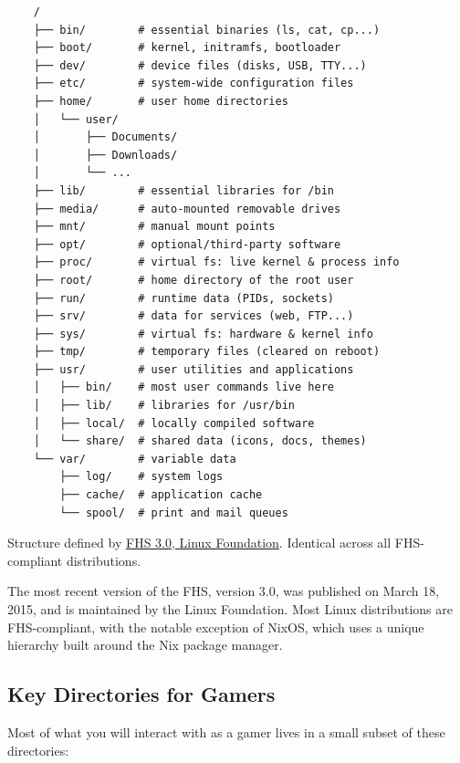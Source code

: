 \documentclass{article}
\begin{document}
\begin{verbatim}
	/
	├── bin/        # essential binaries (ls, cat, cp...)
	├── boot/       # kernel, initramfs, bootloader
	├── dev/        # device files (disks, USB, TTY...)
	├── etc/        # system-wide configuration files
	├── home/       # user home directories
	│   └── user/
	│       ├── Documents/
	│       ├── Downloads/
	│       └── ...
	├── lib/        # essential libraries for /bin
	├── media/      # auto-mounted removable drives
	├── mnt/        # manual mount points
	├── opt/        # optional/third-party software
	├── proc/       # virtual fs: live kernel & process info
	├── root/       # home directory of the root user
	├── run/        # runtime data (PIDs, sockets)
	├── srv/        # data for services (web, FTP...)
	├── sys/        # virtual fs: hardware & kernel info
	├── tmp/        # temporary files (cleared on reboot)
	├── usr/        # user utilities and applications
	│   ├── bin/    # most user commands live here
	│   ├── lib/    # libraries for /usr/bin
	│   ├── local/  # locally compiled software
	│   └── share/  # shared data (icons, docs, themes)
	└── var/        # variable data
	    ├── log/    # system logs
	    ├── cache/  # application cache
	    └── spool/  # print and mail queues
\end{verbatim}

{\footnotesize\color{gray} Structure defined by
	\href{https://refspecs.linuxfoundation.org/FHS_3.0/fhs/index.html}{FHS 3.0,
		Linux Foundation}. Identical across all FHS-compliant distributions.}

\begin{tcolorbox}[arc=12pt, outer arc=10pt,
	colback=blue!4!white, colframe=blue!40!black,
	title=\textbf{FHS 3.0}]
	The most recent version of the FHS, version 3.0, was published on March 18,
	2015, and is maintained by the Linux Foundation. Most Linux distributions are
	FHS-compliant, with the notable exception of NixOS, which uses a unique hierarchy
	built around the Nix package manager. 
\end{tcolorbox}
\subsection{Key Directories for Gamers}

Most of what you will interact with as a gamer lives in a small subset of these
directories:
\end{document}
